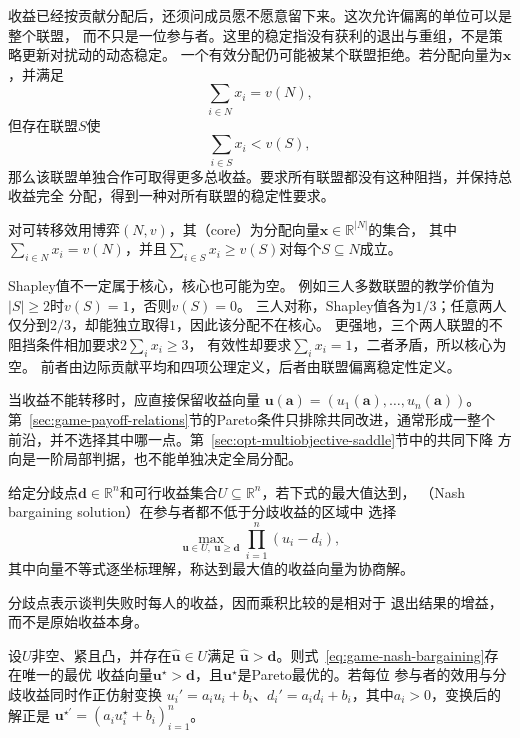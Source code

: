 收益已经按贡献分配后，还须问成员愿不愿意留下来。这次允许偏离的单位可以是整个联盟，
而不只是一位参与者。这里的稳定指没有获利的退出与重组，不是策略更新对扰动的动态稳定。
一个有效分配仍可能被某个联盟拒绝。若分配向量为\(\bm{x}\)，并满足
\[
  \sum_{i\in N}x_i=v(N),
\]
但存在联盟\(S\)使
\[
  \sum_{i\in S}x_i<v(S),
\]
那么该联盟单独合作可取得更多总收益。要求所有联盟都没有这种阻挡，并保持总收益完全
分配，得到一种对所有联盟的稳定性要求。
\begin{definition}[合作博弈的核心]
\label{def:game-cooperative-core}
对可转移效用博弈$(N,v)$，其（core）为分配向量$\bm x\in\mathbb R^{|N|}$的集合，
其中$\sum_{i\in N}x_i=v(N)$，并且$\sum_{i\in S}x_i\geq v(S)$对每个$S\subseteq N$成立。
\end{definition}
Shapley值不一定属于核心，核心也可能为空。
例如三人多数联盟的教学价值为$|S|\geq2$时$v(S)=1$，否则$v(S)=0$。
三人对称，Shapley值各为$1/3$；任意两人仅分到$2/3$，却能独立取得$1$，因此该分配不在核心。
更强地，三个两人联盟的不阻挡条件相加要求$2\sum_i x_i\geq3$，
有效性却要求$\sum_i x_i=1$，二者矛盾，所以核心为空。
前者由边际贡献平均和四项公理定义，后者由联盟偏离稳定性定义。

当收益不能转移时，应直接保留收益向量
\(\bm{u}(\bm{a})=(u_1(\bm{a}),\ldots,u_n(\bm{a}))\)。
第~\ref{sec:game-payoff-relations}节的Pareto条件只排除共同改进，通常形成一整个
前沿，并不选择其中哪一点。第~\ref{sec:opt-multiobjective-saddle}节中的共同下降
方向是一阶局部判据，也不能单独决定全局分配。

\begin{definition}[Nash乘积协商解]
\label{def:game-nash-bargaining-solution}
给定分歧点\(\bm{d}\in\mathbb R^n\)和可行收益集合\(U\subseteq\mathbb{R}^n\)，若下式的最大值达到，
（Nash bargaining solution）在参与者都不低于分歧收益的区域中
选择
\begin{equation}
  \max_{\bm{u}\in U,\ \bm{u}\geq\bm{d}}
  \prod_{i=1}^{n}(u_i-d_i),
  \label{eq:game-nash-bargaining}
\end{equation}
其中向量不等式逐坐标理解，称达到最大值的收益向量为协商解。
\end{definition}
分歧点表示谈判失败时每人的收益，因而乘积比较的是相对于
退出结果的增益，而不是原始收益本身。

\begin{theorem}
\label{thm:game-nash-bargaining-properties}
设\(U\)非空、紧且凸，并存在\(\widehat{\bm{u}}\in U\)满足
\(\widehat{\bm{u}}>\bm{d}\)。则式~\eqref{eq:game-nash-bargaining}存在唯一的最优
收益向量\(\bm{u}^\star>\bm{d}\)，且\(\bm{u}^\star\)是Pareto最优的。若每位
参与者的效用与分歧收益同时作正仿射变换
\(u_i'=a_i u_i+b_i\)、\(d_i'=a_i d_i+b_i\)，其中\(a_i>0\)，变换后的解正是
\(\bm{u}^{\star\prime}=(a_i u_i^\star+b_i)_{i=1}^n\)。
\end{theorem}

